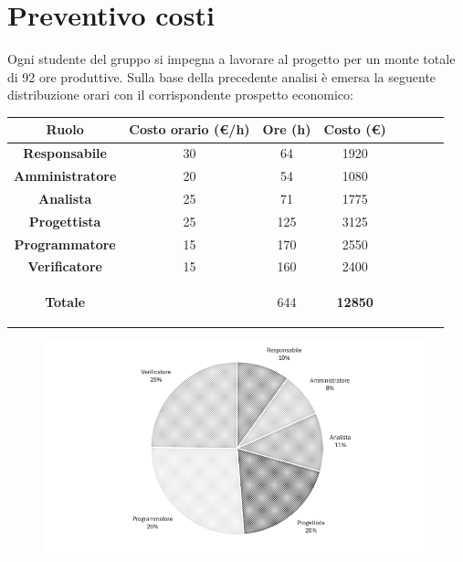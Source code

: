 \section{Preventivo costi}

Ogni studente del gruppo si impegna a lavorare al progetto per un monte totale di 92 ore
produttive. Sulla base della precedente analisi è emersa la seguente distribuzione orari con il corrispondente prospetto economico:

\begin{table}[H]
    \centering
    \renewcommand{\arraystretch}{1.5}
    \begin{tabular}{|>{\bfseries}c|c|c|c|c|c|c|>{\bfseries}c|}
        \hline
        \rowcolor{gray!70} 
        \color{white}\textbf{Ruolo} & \color{white}\textbf{Costo orario (\euro/h)} & \color{white}\textbf{Ore (h)} & \color{white}\textbf{Costo (\euro)} \\
        \hline
        \color{black}\textbf{Responsabile} & 30 & 64 & 1920  \\ 
        \hline
        \rowcolor{gray!10} %
        \color{black}\textbf{Amministratore} & 20 & 54 & 1080 \\ 
        \hline
        \color{black}\textbf{Analista} & 25 & 71 & 1775  \\ 
        \hline
        \rowcolor{gray!10} %
        \color{black}\textbf{Progettista} & 25 & 125 & 3125  \\ 
        \hline
         \color{black}\textbf{Programmatore} & 15 & 170 & 2550 \\ 
        \hline
        \rowcolor{gray!10} %
        \color{black}\textbf{Verificatore} & 15 & 160 & 2400 \\ 
        \hline

        \rowcolor{gray!70} 
        \color{white}\textbf{Totale} & \color{white} & \color{white}644 &  \cellcolor{black}\color{white}\textbf{12850}  \\ 
        \hline
    \end{tabular}


\end{table}

\begin{figure}[H]
    \centering
    \includegraphics[width=\textwidth]{./images/piechart.png}
\end{figure}